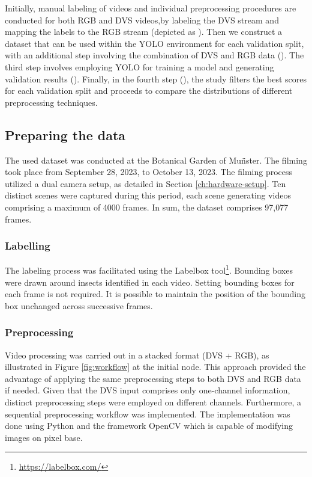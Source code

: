 \documentclass[sigchi,screen]{acmart}
\begin{document}
Initially, manual labeling of videos and individual preprocessing procedures are conducted for both RGB and DVS videos,by labeling the DVS stream and mapping the labels to the RGB stream (depicted as ). Then we construct a  dataset that can be used within the YOLO environment for each validation split, with an additional step involving the combination of DVS and RGB data (). The third step involves employing YOLO for training a model and generating validation results (). Finally, in the fourth step (), the study filters the best scores for each validation split and proceeds to compare the distributions of different preprocessing techniques.

\subsection{Preparing the data}
The used dataset was conducted at the Botanical Garden of Mu\"nster. The filming took place from September 28, 2023, to October 13, 2023. The filming process utilized a dual camera setup, as detailed in Section \ref{ch:hardware-setup}. Ten distinct scenes were captured during this period, each scene generating videos comprising a maximum of 4000 frames. In sum, the dataset comprises 97,077 frames. 

\subsubsection{Labelling}
The labeling process was facilitated using the Labelbox tool\footnote{\url{https://labelbox.com/}}. Bounding boxes were drawn around insects identified in each video. Setting bounding boxes for each frame is not required. It is possible to maintain the position of the bounding box unchanged across successive frames.

\subsubsection{Preprocessing}
Video processing was carried out in a stacked format (DVS + RGB), as illustrated in Figure \ref{fig:workflow} at the initial node. This approach provided the advantage of applying the same preprocessing steps to both DVS and RGB data if needed. Given that the DVS input comprises only one-channel information, distinct preprocessing steps were employed on different channels. Furthermore, a sequential preprocessing workflow was implemented. The implementation was done using Python and the framework OpenCV \citep{bradski2000opencv} which is capable of modifying images on pixel base.
\end{document}
